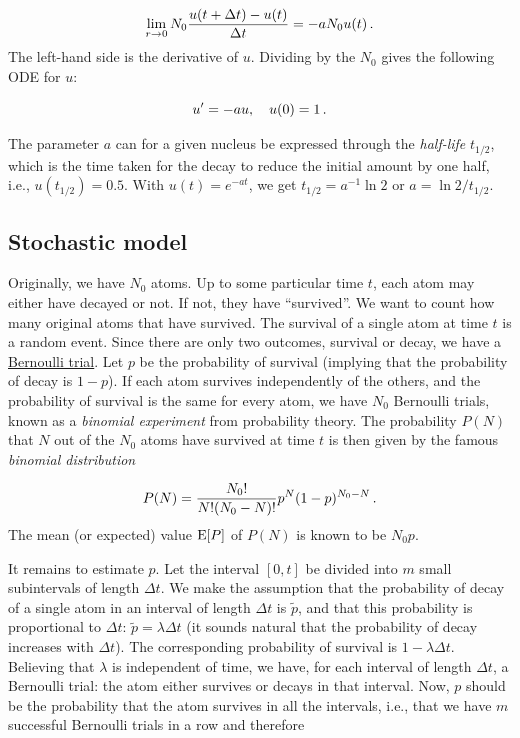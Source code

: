 \documentclass[%
oneside,                 %
final,                   %
10pt]{article}
\begin{document}
\[ \lim_{r\rightarrow 0}
N_0\frac{u(t+\Delta t) - u(t)}{\Delta t} = - a N_0 u(t)\tp\]
The left-hand side is the derivative of $u$. Dividing by the $N_0$ gives
the following ODE for $u$:

\begin{equation}
u^{\prime} = -au,\quad u(0)=1
\tp
\end{equation}

The parameter $a$ can for a given nucleus be expressed through the
\emph{half-life} $t_{1/2}$, which is the time taken for the decay to reduce the
initial amount by one half, i.e., $u(t_{1/2}) = 0.5$.
With $u(t)=e^{-at}$, we get $t_{1/2}=a^{-1}\ln 2$ or $a=\ln 2/t_{1/2}$.


\subsection{Stochastic model}

Originally, we have $N_0$ atoms. Up to some particular time $t$, each
atom may either have decayed or not. If not, they have ``survived''.
We want to count how many original
atoms that have survived.
The survival of a single atom at time $t$ is a random event. Since there
are only two outcomes, survival or decay, we have a
\href{{http://en.wikipedia.org/wiki/Bernoulli_trial}}{Bernoulli trial}.
Let $p$ be the
probability of survival (implying that the probability of decay
is $1-p$). If each atom survives independently of
the others, and the probability of survival is the same for every
atom, we have $N_0$ Bernoulli trials, known as
a \emph{binomial experiment} from probability theory.
The probability $P(N)$ that $N$ out
of the $N_0$ atoms have survived at time $t$ is then given by the
famous \emph{binomial distribution}

\[ P(N) = \frac{N_0!}{N! (N_0-N)!}p^N (1-p)^{N_0-N}\tp \]
The mean (or expected) value $\E{P}$ of $P(N)$ is known to be $N_0p$.

It remains to estimate $p$. Let the interval $[0,t]$ be divided into $m$
small subintervals of length $\Delta t$. We make the assumption that
the probability of decay of a single atom in an interval of length $\Delta t$
is $\tilde p$, and that this probability is proportional to $\Delta t$:
$\tilde p = \lambda\Delta t$ (it sounds natural that the probability
of decay increases with $\Delta t$). The corresponding probability of survival
is $1-\lambda\Delta t$. Believing that $\lambda$ is independent
of time, we have, for each interval of length $\Delta t$,
a Bernoulli trial: the atom either survives or
decays in that interval. Now, $p$ should be the probability that the atom
survives in all the intervals, i.e., that we have $m$ successful
Bernoulli trials in a row and therefore
\end{document}
